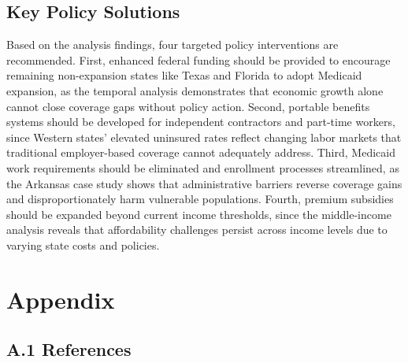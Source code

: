 \documentclass[
]{article}
\begin{document}
\subsection{Key Policy Solutions}\label{key-policy-solutions}

Based on the analysis findings, four targeted policy interventions are
recommended. First, enhanced federal funding should be provided to
encourage remaining non-expansion states like Texas and Florida to adopt
Medicaid expansion, as the temporal analysis demonstrates that economic
growth alone cannot close coverage gaps without policy action. Second,
portable benefits systems should be developed for independent
contractors and part-time workers, since Western states' elevated
uninsured rates reflect changing labor markets that traditional
employer-based coverage cannot adequately address. Third, Medicaid work
requirements should be eliminated and enrollment processes streamlined,
as the Arkansas case study shows that administrative barriers reverse
coverage gains and disproportionately harm vulnerable populations.
Fourth, premium subsidies should be expanded beyond current income
thresholds, since the middle-income analysis reveals that affordability
challenges persist across income levels due to varying state costs and
policies.

\section{Appendix}\label{appendix}

\subsection{A.1 References}\label{a.1-references}
\end{document}
